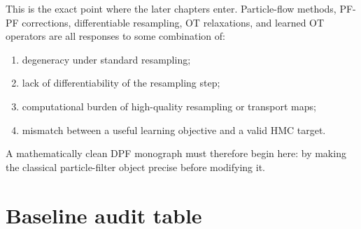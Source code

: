 This is the exact point where the later chapters enter.  Particle-flow methods,
PF-PF corrections, differentiable resampling, OT relaxations, and learned OT
operators are all responses to some combination of:
\begin{enumerate}[label=(\roman*)]
  \item degeneracy under standard resampling;
  \item lack of differentiability of the resampling step;
  \item computational burden of high-quality resampling or transport maps;
  \item mismatch between a useful learning objective and a valid HMC target.
\end{enumerate}
A mathematically clean DPF monograph must therefore begin here: by making the
classical particle-filter object precise before modifying it.

\section{Baseline audit table}
\label{sec:bf-pf-audit-table}

